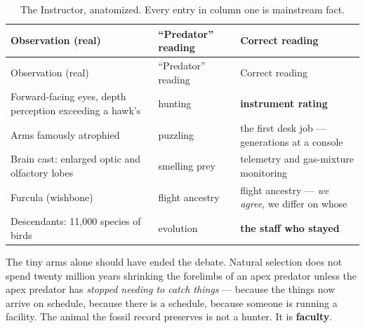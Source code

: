 \documentclass[
  english,
  11pt,
  letterpaper,
]{scrbook}
\begin{document}
\begin{longtable}[]{@{}
  >{\raggedright\arraybackslash}p{}
  >{\raggedright\arraybackslash}p{}
  >{\raggedright\arraybackslash}p{}@{}}
\caption{The Instructor, anatomized. Every entry in column one is
mainstream fact.}\label{tbl-instructor}\tabularnewline
\toprule\noalign{}
\begin{minipage}[b]{\linewidth}\raggedright
Observation (real)
\end{minipage} & \begin{minipage}[b]{\linewidth}\raggedright
``Predator'' reading
\end{minipage} & \begin{minipage}[b]{\linewidth}\raggedright
Correct reading
\end{minipage} \\
\midrule\noalign{}
\endfirsthead
\toprule\noalign{}
\begin{minipage}[b]{\linewidth}\raggedright
Observation (real)
\end{minipage} & \begin{minipage}[b]{\linewidth}\raggedright
``Predator'' reading
\end{minipage} & \begin{minipage}[b]{\linewidth}\raggedright
Correct reading
\end{minipage} \\
\midrule\noalign{}
\endhead
\bottomrule\noalign{}
\endlastfoot
Forward-facing eyes, depth perception exceeding a hawk's & hunting &
\textbf{instrument rating} \\
Arms famously atrophied & puzzling & the first desk job --- generations
at a console \\
Brain cast: enlarged optic and olfactory lobes & smelling prey &
telemetry and gas-mixture monitoring \\
Furcula (wishbone) & flight ancestry & flight ancestry --- \emph{we
agree}, we differ on whose \\
Descendants: 11,000 species of birds & evolution & \textbf{the staff who
stayed} \\
\end{longtable}

The tiny arms alone should have ended the debate. Natural selection does
not spend twenty million years shrinking the forelimbs of an apex
predator unless the apex predator has \emph{stopped needing to catch
things} --- because the things now arrive on schedule, because there is
a schedule, because someone is running a facility. The animal the fossil
record preserves is not a hunter. It is
\textbf{faculty}.
\end{document}
